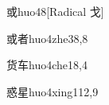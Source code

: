 \begin{verbete}{或}{huo4}{8}[Radical 戈]
\end{verbete}

\begin{verbete}{或者}{huo4zhe3}{8,8}
\end{verbete}

\begin{verbete}{货车}{huo4che1}{8,4}
\end{verbete}

\begin{verbete}{惑星}{huo4xing1}{12,9}
\end{verbete}

